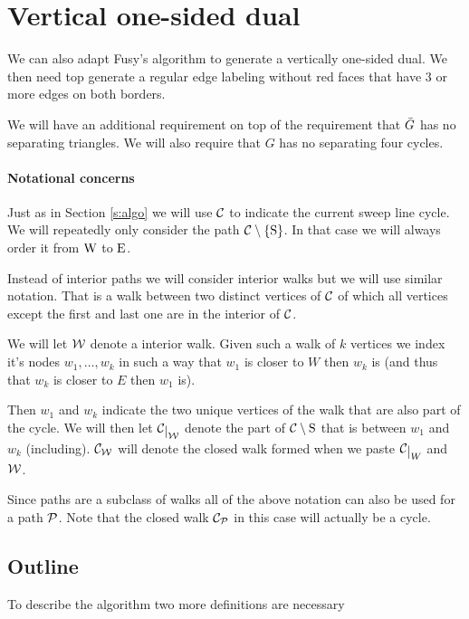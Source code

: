 

\section{Vertical one-sided dual}
\label{s:red}

We can also adapt Fusy's algorithm to generate a vertically one-sided dual. We then need top generate a regular edge labeling without red faces that have $3$ or more edges on both borders.

We will have an additional requirement on top of the requirement that $\ext G$ has no separating triangles. We will also require that $G$ has no separating four cycles.


\paragraph{Notational concerns}
Just as in Section \ref{s:algo} we will use $\C$ to indicate the current sweep line cycle.
We will repeatedly only consider the path $\cpath$. In that case we will always order it from $\pW$ to $\pE$.

Instead of interior paths we will consider interior walks but we will use similar notation. That is a walk between two distinct vertices of $\C$ of which all vertices except the first and last one are in the interior of $\C$.

We will let $\W$ denote a interior walk. Given such a walk of $k$ vertices we index it's nodes $w_1, \ldots, w_k$  in such a way that $w_1$ is closer to $W$ then $w_k$ is (and thus that $w_k$ is closer to $E$ then $w_1$ is).

Then $w_1$ and $w_k$ indicate the two unique vertices of the walk that are also part of the cycle. We will then let $\restC{\W}$ denote the part of $\C\setminus {\mathrm{S}}$ that is between $w_1$ and $w_k$ (including). $\C_\W$ will denote the closed walk formed when we paste $\restC{W}$ and $\W$.

Since paths are a subclass of walks all of the above notation can also be used for a path $\P$. Note that the closed walk $\C_\P$ in this case will actually be a cycle.


\subsection{Outline}
To describe the algorithm two more definitions are necessary

